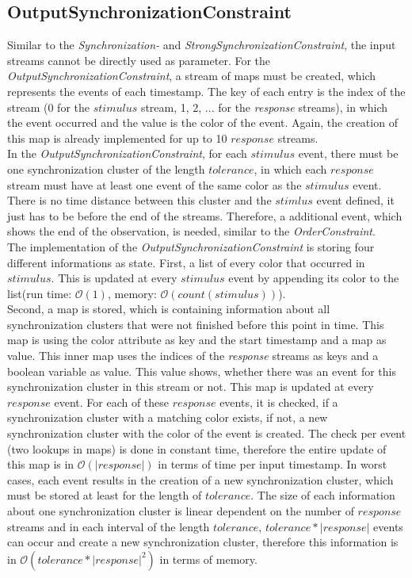\subsection{OutputSynchronizationConstraint}
	Similar to the \emph{Synchronization-} and \emph{StrongSynchronizationConstraint}, the input streams cannot be directly used as parameter. For the \emph{OutputSynchronizationConstraint}, a stream of maps must be created, which represents the events of each timestamp. The key of each entry is the index of the stream (0 for the $stimulus$ stream, 1, 2, ... for the \textit{response} streams), in which the event occurred and the value is the color of the event. Again, the creation of this map is already implemented for up to 10 $response$ streams.\\
	In the \emph{OutputSynchronizationConstraint}, for each $stimulus$ event, there must be one synchronization cluster of the length $tolerance$, in which each $response$ stream must have at least one event of the same color as the $stimulus$ event. There is no time distance between this cluster and the $stimlus$ event defined, it just has to be before the end of the streams. Therefore, a additional event, which shows the end of the observation, is needed, similar to the \emph{OrderConstraint}.\\
	The implementation of the \emph{OutputSynchronizationConstraint} is storing four different informations as state. First, a list of every color that occurred in $stimulus$. This is updated at every $stimulus$ event by appending its color to the list(run time: $\mathcal{O}(1)$, memory: $\mathcal{O}(count(stimulus))$).\\
	Second, a map is stored, which is containing information about all synchronization clusters that were not finished before this point in time. This map is using the color attribute as key and the start timestamp and a map as value. This inner map uses the indices of the \textit{response} streams as keys and a boolean variable as value. This value shows, whether there was an event for this synchronization cluster in this stream or not. This map is updated at every $response$ event. For each of these $response$ events, it is checked, if a synchronization cluster with a matching color exists, if not, a new synchronization cluster with the color of the event is created. The check per event (two lookups in maps)  is done in constant time, therefore the entire update of this map is in $\mathcal{O}(|response|)$ in terms of time per input timestamp. In worst cases, each event results in the creation of a new synchronization cluster, which must be stored at least for the length of $tolerance$. The size of each information about one synchronization cluster is linear dependent on the number of $response$ streams and in each interval of the length $tolerance$, $tolerance*|response|$ events can occur and create a new synchronization cluster, therefore this information is in $\mathcal{O}(tolerance*|response|^2)$ in terms of memory. 
